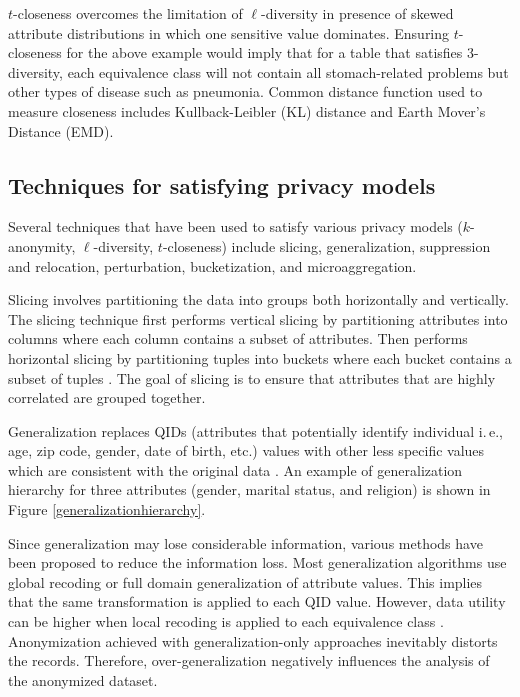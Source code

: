 \documentclass{bioinfo}
\newcommand{\mpara}[1]{\medskip\noindent{\bf #1}}
\begin{document}
$t$-closeness overcomes the limitation of $\ell$-diversity in presence of skewed attribute distributions in which one sensitive value dominates. Ensuring $t$-closeness for the above example would imply that for a table that satisfies 3-diversity, each equivalence class will not contain all stomach-related problems but other types of disease such as pneumonia. Common distance function used to measure closeness includes Kullback-Leibler (KL) distance and Earth Mover's Distance (EMD).

\subsection{Techniques for satisfying privacy models}
\label{sec:privacymodeltech}
Several techniques that have been used to satisfy various privacy models ($k$-anonymity, $\ell$-diversity, $t$-closeness) include slicing, generalization, suppression and relocation, perturbation, bucketization, and microaggregation. 

\mpara{Slicing.} Slicing involves partitioning the data into groups both horizontally and vertically. The slicing technique first performs vertical slicing by partitioning attributes into columns where each column contains a subset of attributes. Then performs horizontal slicing by partitioning tuples into buckets where each bucket contains a subset of tuples \cite{cite2li2010slicing}. The goal of slicing is to ensure that attributes that are highly correlated are grouped together. 

\mpara{Generalization.} Generalization replaces QIDs (attributes that potentially identify individual i.\,e., age, zip code, gender, date of birth, etc.) values with other less specific values which are consistent with the original data \cite{cite2lee2017utility}. An example of generalization hierarchy for three attributes (gender, marital status, and religion) is shown in Figure \ref{generalizationhierarchy}.

Since generalization may lose considerable information, various methods have been proposed to reduce the information loss. 
Most generalization algorithms use global recoding or full domain generalization of attribute values. This implies that the same transformation is applied to each QID value. However, data utility can be higher when local recoding is applied to each equivalence class \cite{cite433xu2006utility}. Anonymization achieved with generalization-only approaches inevitably distorts the records. Therefore, over-generalization negatively influences the analysis of the anonymized dataset.
\end{document}
